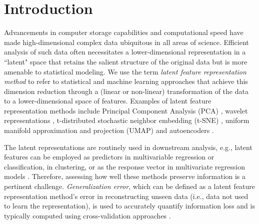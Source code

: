 \section{Introduction}

Advancements in computer storage capabilities and computational speed have made high-dimensional complex data ubiquitous in all areas of science.
Efficient analysis of such data often necessitates a lower-dimensional representation in a ``latent" space that retains the salient structure of the original data but is more amenable to statistical modeling.
We use the term \emph{latent feature representation method} to refer to statistical and machine learning approaches that achieve this dimension reduction through a (linear or non-linear) transformation of the data to a lower-dimensional space of features.
Examples of latent feature representation methods include Principal Component Analysis (PCA) \parencite{hotelling_analysis_1933}, wavelet representations \parencite{daubechies_wavelet_1990}, t-distributed stochastic neighbor embedding (t-SNE) \parencite{maaten_visualizing_2008}, uniform manifold approximation and projection (UMAP) \parencite{mcinnes_umap_2020} and autoencoders \parencite{rumelhart_learning_1986}.

The latent representations are routinely used in downstream analysis, e.g., latent features can be employed as predictors in multivariable regression or classification, in clustering, or as the response vector in multivariate regression models \parencite{niu_dimensionality_2011,wang_role_2014,cook_fisher_2007}. 
Therefore, assessing how well these methods preserve information is a pertinent challenge.
\emph{Generalization error}, which can be defined as a latent feature representation method's error in reconstructing unseen data (i.e., data not used to learn the representation), is used to accurately quantify information loss and is typically computed using cross-validation approaches \parencite[see, e.g.,][]{becht_dimensionality_2019, wold_cross-validatory_1978, eastment_cross-validatory_1982,krzanowski_cross-validation_1987, minka_automatic_2000, rajan_bayesian_1994, camacho_cross-validation_2014, diana_cross-validation_2002, hubert_fast_2007, josse_selecting_2012, saccenti_use_2015}.

